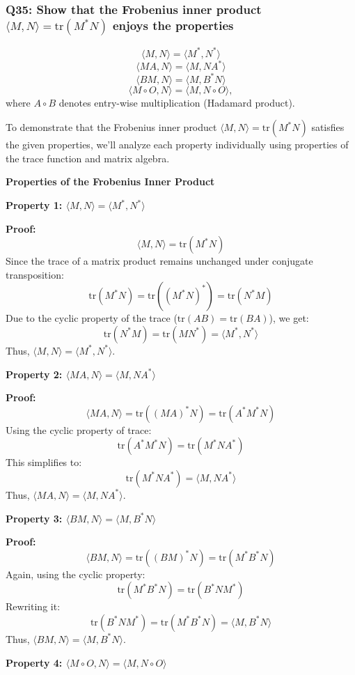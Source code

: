 \documentclass[8pt]{article}
\begin{document}
\subsubsection*{Q35: Show that the Frobenius inner product \(\langle M, N \rangle = \text{tr}(M^*N)\) enjoys the properties}
\[
\langle M, N \rangle = \langle M^*, N^* \rangle
\]
\[
\langle MA, N \rangle = \langle M, NA^* \rangle
\]
\[
\langle BM, N \rangle = \langle M, B^*N \rangle
\]
\[
\langle M \circ O, N \rangle = \langle M, N \circ O \rangle,
\]
where \(A \circ B\) denotes entry-wise multiplication (Hadamard product).

To demonstrate that the Frobenius inner product \( \langle M, N \rangle = \text{tr}(M^*N) \) satisfies the given properties, we'll analyze each property individually using properties of the trace function and matrix algebra.

\textbf{Properties of the Frobenius Inner Product}

\textbf{Property 1: \(\langle M, N \rangle = \langle M^*, N^* \rangle\)}

\textbf{Proof:}
\[
\langle M, N \rangle = \text{tr}(M^*N)
\]
Since the trace of a matrix product remains unchanged under conjugate transposition:
\[
\text{tr}(M^*N) = \text{tr}((M^*N)^*) = \text{tr}(N^*M)
\]
Due to the cyclic property of the trace (\(\text{tr}(AB) = \text{tr}(BA)\)), we get:
\[
\text{tr}(N^*M) = \text{tr}(MN^*) = \langle M^*, N^* \rangle
\]
Thus, \( \langle M, N \rangle = \langle M^*, N^* \rangle \).

\textbf{Property 2: \(\langle MA, N \rangle = \langle M, NA^* \rangle\)}

\textbf{Proof:}
\[
\langle MA, N \rangle = \text{tr}((MA)^*N) = \text{tr}(A^*M^*N)
\]
Using the cyclic property of trace:
\[
\text{tr}(A^*M^*N) = \text{tr}(M^*NA^*)
\]
This simplifies to:
\[
\text{tr}(M^*NA^*) = \langle M, NA^* \rangle
\]
Thus, \( \langle MA, N \rangle = \langle M, NA^* \rangle \).

\textbf{Property 3: \(\langle BM, N \rangle = \langle M, B^*N \rangle\)}

\textbf{Proof:}
\[
\langle BM, N \rangle = \text{tr}((BM)^*N) = \text{tr}(M^*B^*N)
\]
Again, using the cyclic property:
\[
\text{tr}(M^*B^*N) = \text{tr}(B^*NM^*)
\]
Rewriting it:
\[
\text{tr}(B^*NM^*) = \text{tr}(M^*B^*N) = \langle M, B^*N \rangle
\]
Thus, \( \langle BM, N \rangle = \langle M, B^*N \rangle \).

\textbf{Property 4: \(\langle M \circ O, N \rangle = \langle M, N \circ O \rangle\)}
\end{document}
